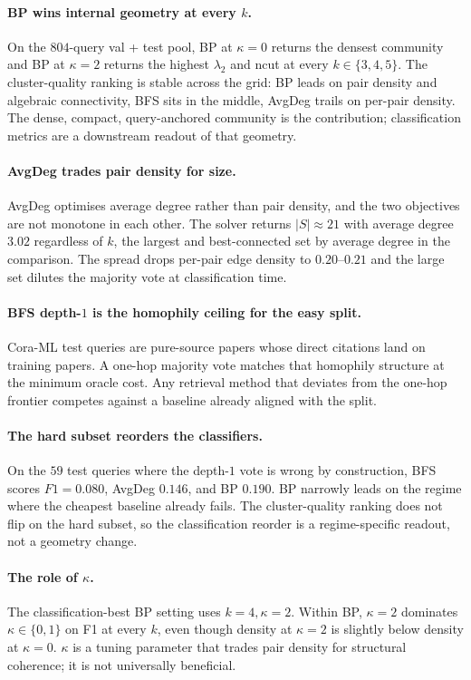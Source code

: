 \documentclass[11pt]{article}
\begin{document}
\paragraph{BP wins internal geometry at every $k$.}
On the $804$-query val + test pool, BP at $\kappa = 0$ returns the
densest community and BP at $\kappa = 2$ returns the highest $\lambda_2$
and ncut at every $k \in \{3, 4, 5\}$. The cluster-quality ranking is
stable across the grid: BP leads on pair density and algebraic
connectivity, BFS sits in the middle, AvgDeg trails on per-pair density.
The dense, compact, query-anchored community is the contribution;
classification metrics are a downstream readout of that geometry.

\paragraph{AvgDeg trades pair density for size.}
AvgDeg optimises average degree rather than pair density, and the two
objectives are not monotone in each other. The solver returns
$|S| \approx 21$ with average degree $3.02$ regardless of $k$, the
largest and best-connected set by average degree in the comparison. The
spread drops per-pair edge density to $0.20$--$0.21$ and the large set
dilutes the majority vote at classification time.

\paragraph{BFS depth-$1$ is the homophily ceiling for the easy split.}
Cora-ML test queries are pure-source papers whose direct citations land
on training papers. A one-hop majority vote matches that homophily
structure at the minimum oracle cost. Any retrieval method that deviates
from the one-hop frontier competes against a baseline already aligned
with the split.

\paragraph{The hard subset reorders the classifiers.}
On the $59$ test queries where the depth-$1$ vote is wrong by
construction, BFS scores $F1 = 0.080$, AvgDeg $0.146$, and BP $0.190$.
BP narrowly leads on the regime where the cheapest baseline already
fails. The cluster-quality ranking does not flip on the hard subset, so
the classification reorder is a regime-specific readout, not a geometry
change.

\paragraph{The role of $\kappa$.}
The classification-best BP setting uses $k = 4, \kappa = 2$. Within BP,
$\kappa = 2$ dominates $\kappa \in \{0, 1\}$ on F1 at every $k$, even
though density at $\kappa = 2$ is slightly below density at $\kappa = 0$.
$\kappa$ is a tuning parameter that trades pair density for structural
coherence; it is not universally beneficial.
\end{document}
